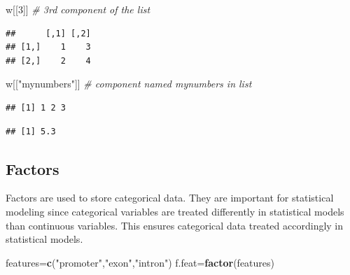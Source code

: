 \documentclass[12pt,]{krantz}
\newenvironment{Shaded}{\begin{snugshade}}{\end{snugshade}}
\newcommand{\CommentTok}[1]{\textcolor[rgb]{0.56,0.35,0.01}{\textit{#1}}}
\newcommand{\DecValTok}[1]{\textcolor[rgb]{0.00,0.00,0.81}{#1}}
\newcommand{\KeywordTok}[1]{\textcolor[rgb]{0.13,0.29,0.53}{\textbf{#1}}}
\newcommand{\NormalTok}[1]{#1}
\newcommand{\OperatorTok}[1]{\textcolor[rgb]{0.81,0.36,0.00}{\textbf{#1}}}
\newcommand{\StringTok}[1]{\textcolor[rgb]{0.31,0.60,0.02}{#1}}
\theoremstyle{definition}
\theoremstyle{definition}
\theoremstyle{definition}
\theoremstyle{remark}
\begin{document}
\begin{Shaded}
\begin{Highlighting}[]
\NormalTok{w[[}\DecValTok{3}\NormalTok{]] }\CommentTok{# 3rd component of the list}
\end{Highlighting}
\end{Shaded}

\begin{verbatim}
##      [,1] [,2]
## [1,]    1    3
## [2,]    2    4
\end{verbatim}

\begin{Shaded}
\begin{Highlighting}[]
\NormalTok{w[[}\StringTok{"mynumbers"}\NormalTok{]] }\CommentTok{# component named mynumbers in list}
\end{Highlighting}
\end{Shaded}

\begin{verbatim}
## [1] 1 2 3
\end{verbatim}

\begin{Shaded}
\end{Shaded}

\begin{verbatim}
## [1] 5.3
\end{verbatim}

\hypertarget{factors}{%
\subsection{Factors}\label{factors}}

Factors are used to store categorical data. They are important for
statistical modeling since categorical variables are treated differently
in statistical models than continuous variables. This ensures
categorical data treated accordingly in statistical models.

\begin{Shaded}
\begin{Highlighting}[]
\NormalTok{features=}\KeywordTok{c}\NormalTok{(}\StringTok{"promoter"}\NormalTok{,}\StringTok{"exon"}\NormalTok{,}\StringTok{"intron"}\NormalTok{)}
\NormalTok{f.feat=}\KeywordTok{factor}\NormalTok{(features)}
\end{Highlighting}
\end{Shaded}
\end{document}
